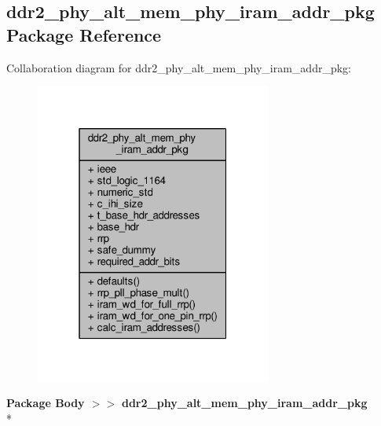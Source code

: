\subsection{ddr2\+\_\+phy\+\_\+alt\+\_\+mem\+\_\+phy\+\_\+iram\+\_\+addr\+\_\+pkg Package Reference}
\label{classddr2__phy__alt__mem__phy__iram__addr__pkg}


Collaboration diagram for ddr2\+\_\+phy\+\_\+alt\+\_\+mem\+\_\+phy\+\_\+iram\+\_\+addr\+\_\+pkg\+:\nopagebreak
\begin{figure}[H]
\begin{center}
\leavevmode
\includegraphics[width=220pt]{d9/dc5/classddr2__phy__alt__mem__phy__iram__addr__pkg__coll__graph}
\end{center}
\end{figure}
{\bfseries Package Body $>$$>$ }{\bf ddr2\+\_\+phy\+\_\+alt\+\_\+mem\+\_\+phy\+\_\+iram\+\_\+addr\+\_\+pkg}\\*
